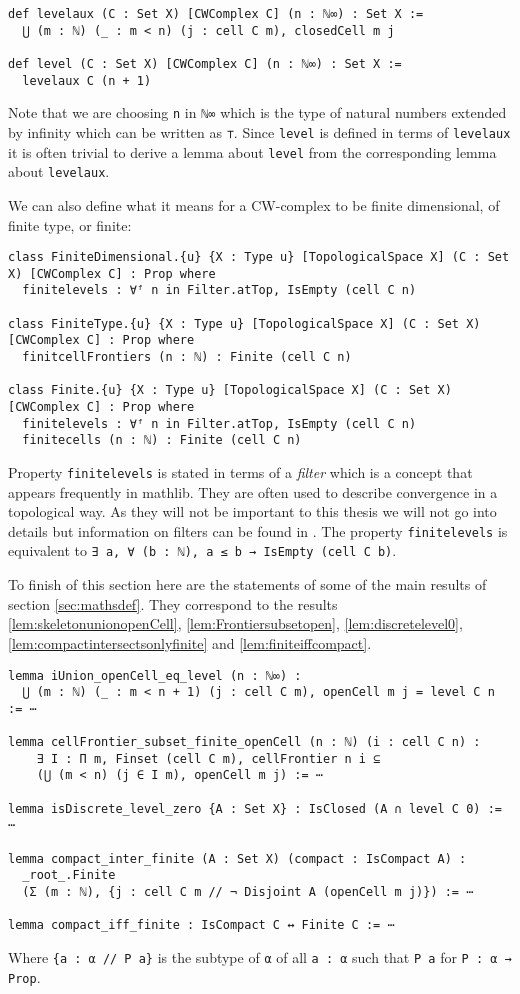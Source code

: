 \begin{lstlisting}
def levelaux (C : Set X) [CWComplex C] (n : ℕ∞) : Set X :=
  ⋃ (m : ℕ) (_ : m < n) (j : cell C m), closedCell m j

def level (C : Set X) [CWComplex C] (n : ℕ∞) : Set X :=
  levelaux C (n + 1)
\end{lstlisting}

Note that we are choosing \lstinline{n} in \lstinline{ℕ∞} which is the type of natural numbers extended by infinity which can be written as \lstinline{⊤}. 
Since \lstinline{level} is defined in terms of \lstinline{levelaux} it is often trivial to derive a lemma about \lstinline{level} from the corresponding lemma about \lstinline{levelaux}. 

We can also define what it means for a CW-complex to be finite dimensional, of finite type, or finite: 

\begin{lstlisting}
class FiniteDimensional.{u} {X : Type u} [TopologicalSpace X] (C : Set X) [CWComplex C] : Prop where
  finitelevels : ∀ᶠ n in Filter.atTop, IsEmpty (cell C n)

class FiniteType.{u} {X : Type u} [TopologicalSpace X] (C : Set X) [CWComplex C] : Prop where
  finitcellFrontiers (n : ℕ) : Finite (cell C n)

class Finite.{u} {X : Type u} [TopologicalSpace X] (C : Set X) [CWComplex C] : Prop where
  finitelevels : ∀ᶠ n in Filter.atTop, IsEmpty (cell C n)
  finitecells (n : ℕ) : Finite (cell C n)
\end{lstlisting}

Property \lstinline{finitelevels} is stated in terms of a \emph{filter} which is a concept that appears frequently in mathlib.
They are often used to describe convergence in a topological way. 
As they will not be important to this thesis we will not go into details but information on filters can be found in \cite{Bourbaki1966}. 
The property \lstinline{finitelevels} is equivalent to \lstinline{∃ a, ∀ (b : ℕ), a ≤ b → IsEmpty (cell C b)}. 

To finish of this section here are the statements of some of the main results of section \ref{sec:mathsdef}.
They correspond to the results \ref{lem:skeletonunionopenCell}, \ref{lem:Frontiersubsetopen}, \ref{lem:discretelevel0}, \ref{lem:compactintersectsonlyfinite} and \ref{lem:finiteiffcompact}.

\begin{lstlisting}
lemma iUnion_openCell_eq_level (n : ℕ∞) :
  ⋃ (m : ℕ) (_ : m < n + 1) (j : cell C m), openCell m j = level C n := ⋯

lemma cellFrontier_subset_finite_openCell (n : ℕ) (i : cell C n) : 
    ∃ I : Π m, Finset (cell C m), cellFrontier n i ⊆ 
    (⋃ (m < n) (j ∈ I m), openCell m j) := ⋯

lemma isDiscrete_level_zero {A : Set X} : IsClosed (A ∩ level C 0) := ⋯

lemma compact_inter_finite (A : Set X) (compact : IsCompact A) :
  _root_.Finite 
  (Σ (m : ℕ), {j : cell C m // ¬ Disjoint A (openCell m j)}) := ⋯

lemma compact_iff_finite : IsCompact C ↔ Finite C := ⋯
\end{lstlisting}

Where \lstinline|{a : α // P a}| is the subtype of \lstinline{α} of all \lstinline{a : α} such that \lstinline{P a} for \lstinline{P : α → Prop}.